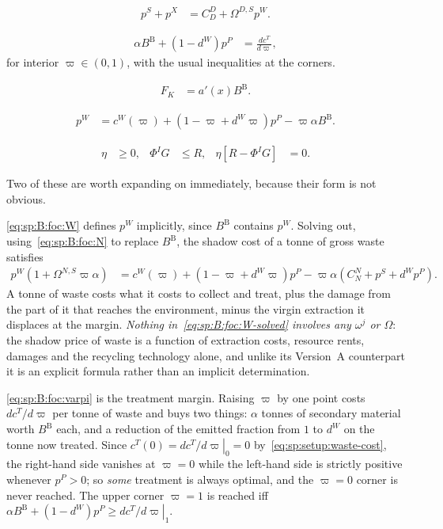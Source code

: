 \begin{align}
p^S+p^X &= C^D_D+\Omega^{D,S}p^W .
\label{eq:sp:B:foc:D}
\end{align}

\begin{align}
\alpha B^{\mathrm B}+\left(1-d^W\right)p^P &= \frac{dc^T}{d\varpi},
\label{eq:sp:B:foc:varpi}
\end{align}
for interior $\varpi\in\left(0,1\right)$, with the usual inequalities at the corners.

\begin{align}
F_K &= a'\!\left(x\right)B^{\mathrm B} .
\label{eq:sp:B:foc:KR}
\end{align}

\begin{align}
p^W &= c^W\!\left(\varpi\right)+\left(1-\varpi+d^W\varpi\right)p^P-\varpi\alpha B^{\mathrm B} .
\label{eq:sp:B:foc:W}
\end{align}

\begin{align}
\eta &\ge0,
&
\Phi^IG &\le R,
&
\eta\left[R-\Phi^IG\right] &= 0 .
\label{eq:sp:B:foc:cs}
\end{align}

Two of these are worth expanding on immediately, because their form is not obvious.

\eqref{eq:sp:B:foc:W} defines $p^W$ implicitly, since $B^{\mathrm B}$ contains $p^W$. Solving out,
using~\eqref{eq:sp:B:foc:N} to replace $B^{\mathrm B}$, the shadow cost of a tonne of gross waste satisfies
\begin{align}
p^W\left(1+\Omega^{N,S}\varpi\alpha\right)
&= c^W\!\left(\varpi\right)+\left(1-\varpi+d^W\varpi\right)p^P
-\varpi\alpha\left(C^N_N+p^S+d^Wp^P\right).
\label{eq:sp:B:foc:W-solved}
\end{align}
A tonne of waste costs what it costs to collect and treat, plus the damage from the part of it that
reaches the environment, minus the virgin extraction it displaces at the margin. \emph{Nothing
in~\eqref{eq:sp:B:foc:W-solved} involves any $\omega^j$ or $\Omega$}: the shadow price of waste is a
function of extraction costs, resource rents, damages and the recycling technology alone, and unlike
its Version~A counterpart it is an explicit formula rather than an implicit determination.

\eqref{eq:sp:B:foc:varpi} is the treatment margin. Raising $\varpi$ by one point costs $dc^T/d\varpi$
per tonne of waste and buys two things: $\alpha$ tonnes of secondary material worth $B^{\mathrm B}$ each, and a
reduction of the emitted fraction from $1$ to $d^W$ on the tonne now treated. Since
$c^T(0)=\left.dc^T/d\varpi\right|_{0}=0$ by~\eqref{eq:sp:setup:waste-cost}, the right-hand side vanishes
at $\varpi=0$ while the left-hand side is strictly positive whenever $p^P>0$; so \emph{some} treatment
is always optimal, and the $\varpi=0$ corner is never reached. The upper corner $\varpi=1$ is reached
iff $\alpha B^{\mathrm B}+\left(1-d^W\right)p^P\ge\left.dc^T/d\varpi\right|_{1}$.


